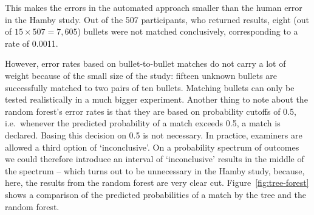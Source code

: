 \documentclass[aoas, preprint]{imsart}\usepackage[]{graphicx}\usepackage[]{color}
\newcommand{\hh}[1]{{\color{magenta} #1}}
\begin{document}
This makes the errors in the automated approach smaller than the human error in the Hamby study. Out of the 507 participants, who returned results, eight (out of $15 \times 507 = 7,605$) bullets were not matched conclusively, corresponding to a rate of 0.0011. 

However, error rates based on bullet-to-bullet matches do not carry a lot of weight because of the small size of the study: fifteen unknown bullets are successfully matched to two pairs of ten bullets. Matching bullets can only be tested realistically in a much bigger experiment. 
Another thing to note about  the random forest's error rates is that they are based on probability cutoffs of 0.5, i.e.\ whenever the predicted probability of a match exceeds 0.5, a match is declared. Basing this decision on 0.5 is not necessary. In practice, examiners are allowed a third option of `inconclusive'. On a probability spectrum of outcomes we could therefore introduce an interval of `inconclusive' results in the middle of the spectrum -- which turns out to be unnecessary in the Hamby study, because, here, the results from the random forest are very clear cut. Figure~\ref{fig:tree-forest} shows a comparison of the predicted probabilities of a match by the tree and the random forest. %
\end{document}

